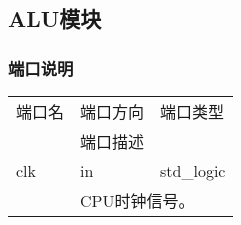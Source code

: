     \subsection{ALU模块}
        \subsubsection{端口说明}
            \begin{tabularx}{\textwidth}{lll}
            \toprule
            端口名          & 端口方向 & 端口类型 \\
            \cmidrule(l){2-3}
                            & \multicolumn{2}{l}{端口描述} \\
            \midrule
            clk             & in       & std\_logic \\
            \cmidrule(l){2-3}
            &
            \multicolumn{2}{X}{CPU时钟信号。} \\
            \midrule
            

\end{tabularx}
